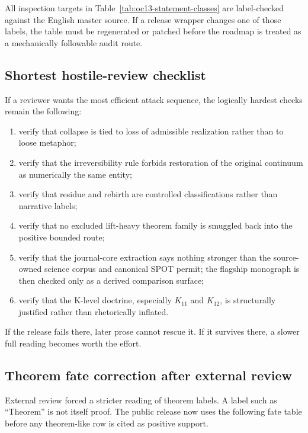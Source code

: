 All inspection targets in Table~\ref{tab:oc13-statement-classes} are
label-checked against the English master source. If a release wrapper changes
one of those labels, the table must be regenerated or patched before the
roadmap is treated as a mechanically followable audit route.

\subsection{Shortest hostile-review checklist}

If a reviewer wants the most efficient attack sequence, the logically hardest
checks remain the following:

\begin{enumerate}
\item verify that collapse is tied to loss of admissible realization rather
      than to loose metaphor;
\item verify that the irreversibility rule forbids restoration of the original
      continuum as numerically the same entity;
\item verify that residue and rebirth are controlled classifications rather
      than narrative labels;
\item verify that no excluded lift-heavy theorem family is smuggled back into
      the positive bounded route;
\item verify that the journal-core extraction says nothing stronger than the
      source-owned science corpus and canonical SPOT permit; the flagship
      monograph is then checked only as a derived comparison surface;
\item verify that the K-level doctrine, especially \(K_{11}\) and \(K_{12}\),
      is structurally justified rather than rhetorically inflated.
\end{enumerate}

If the release fails there, later prose cannot rescue it. If it survives
there, a slower full reading becomes worth the effort.


\subsection{Theorem fate correction after external review}
\label{sec:oc13-theorem-fate-correction-v3}

External review forced a stricter reading of theorem labels. A label such as
``Theorem'' is not itself proof. The public release now uses the following fate
table before any theorem-like row is cited as positive support.

